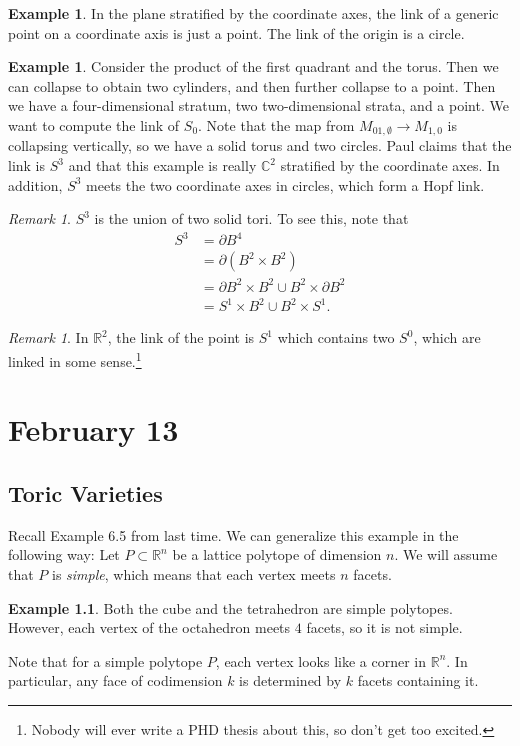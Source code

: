 \documentclass[leqno, openany]{memoir}
\theoremstyle{definition}
\newtheorem{exm}[thm]{Example}
\theoremstyle{remark}
\newtheorem{rmk}[thm]{Remark}
\theoremstyle{plain}
\theoremstyle{definition}
\theoremstyle{remark}
\newcommand{\R}{\mathbb{R}}
\newcommand{\C}{\mathbb{C}}
\begin{document}
\begin{exm}
    In the plane stratified by the coordinate axes, the link of a generic point on a coordinate axis is just a point. The link of the origin is a circle.
\end{exm}

\begin{exm}
    Consider the product of the first quadrant and the torus. Then we can collapse to obtain two cylinders, and then further collapse to a point. Then we have a four-dimensional stratum, two two-dimensional strata, and a point. We want to compute the link of $S_0$. Note that the map from $M_{01,\emptyset} \to M_{1,0}$ is collapsing vertically, so we have a solid torus and two circles. Paul claims that the link is $S^3$ and that this example is really $\C^2$ stratified by the coordinate axes. In addition, $S^3$ meets the two coordinate axes in circles, which form a Hopf link.
\end{exm}

\begin{rmk}
    $S^3$ is the union of two solid tori. To see this, note that
    \begin{align*}
        S^3 &= \partial B^4 \\
            &= \partial (B^2 \times B^2) \\
            &= \partial B^2 \times B^2 \cup B^2 \times \partial B^2 \\
            &= S^1 \times B^2 \cup B^2 \times S^1.
    \end{align*}
\end{rmk}

\begin{rmk}
    In $\R^2$, the link of the point is $S^1$ which contains two $S^0$, which are linked in some sense.\footnote{Nobody will ever write a PHD thesis about this, so don't get too excited.}
\end{rmk}

\chapter{February 13}%
\label{cha:february_13}

\section{Toric Varieties}%
\label{sec:toric_varieties}

Recall Example 6.5 from last time. We can generalize this example in the following way: Let $P \subset \R^n$ be a lattice polytope of dimension $n$. We will assume that $P$ is \textit{simple}, which means that each vertex meets $n$ facets.
\begin{exm}
    Both the cube and the tetrahedron are simple polytopes. However, each vertex of the octahedron meets $4$ facets, so it is not simple.
\end{exm}
Note that for a simple polytope $P$, each vertex looks like a corner in $\R^n$. In particular, any face of codimension $k$ is determined by $k$ facets containing it. 
\end{document}
